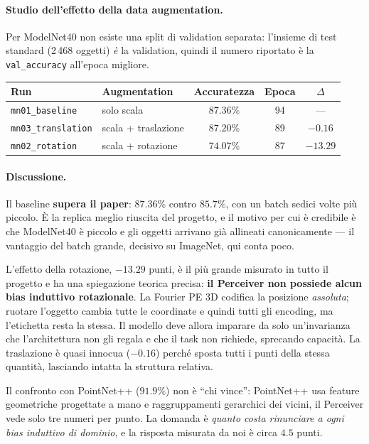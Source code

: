 \documentclass[
  11pt,
]{article}
\begin{document}
\paragraph{Studio dell'effetto della data augmentation.}
Per ModelNet40 non esiste una split di validation separata: l'insieme di test standard (2\,468 oggetti) \emph{è} la validation, quindi il numero riportato è la \texttt{val\_accuracy} all'epoca migliore.

\begin{center}
{\small
\begin{tabular}{@{}llccc@{}}
\toprule
\textbf{Run} & \textbf{Augmentation} & \textbf{Accuratezza} & \textbf{Epoca} & \textbf{$\Delta$} \\
\midrule
\texttt{mn01\_baseline} & solo scala & $\mathbf{87.36\%}$ & 94 & --- \\[2pt]
\texttt{mn03\_translation} & scala + traslazione & $87.20\%$ & 89 & $-0.16$ \\[2pt]
\texttt{mn02\_rotation} & scala + rotazione & $74.07\%$ & 87 & $\mathbf{-13.29}$ \\
\bottomrule
\end{tabular}
}
\end{center}

\paragraph{Discussione.} Il baseline \textbf{supera il paper}: $87.36\%$ contro $85.7\%$, con un batch sedici volte più piccolo. È la replica meglio riuscita del progetto, e il motivo per cui è credibile è che ModelNet40 è piccolo e gli oggetti arrivano già allineati canonicamente --- il vantaggio del batch grande, decisivo su ImageNet, qui conta poco.

L'effetto della rotazione, $-13.29$ punti, è il più grande misurato in tutto il progetto e ha una spiegazione teorica precisa: \textbf{il Perceiver non possiede alcun bias induttivo rotazionale}. La Fourier PE 3D codifica la posizione \emph{assoluta}; ruotare l'oggetto cambia tutte le coordinate e quindi tutti gli encoding, ma l'etichetta resta la stessa. Il modello deve allora imparare da solo un'invarianza che l'architettura non gli regala e che il task non richiede, sprecando capacità. La traslazione è quasi innocua ($-0.16$) perché sposta tutti i punti della stessa quantità, lasciando intatta la struttura relativa.

Il confronto con PointNet++ ($91.9\%$) non è ``chi vince'': PointNet++ usa feature geometriche progettate a mano e raggruppamenti gerarchici dei vicini, il Perceiver vede solo tre numeri per punto. La domanda è \emph{quanto costa rinunciare a ogni bias induttivo di dominio}, e la risposta misurata da noi è circa $4.5$ punti.
\end{document}
